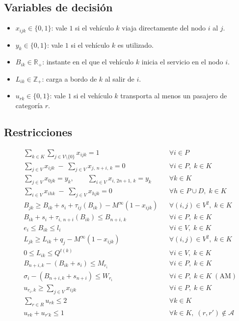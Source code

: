 \subsection{Variables de decisión}
\begin{itemize}
    \item $x_{ijk}\in\{0,1\}$: vale $1$ si el vehículo $k$ viaja directamente del nodo $i$ al $j$.
    \item $y_k\in\{0,1\}$: vale $1$ si el vehículo $k$ es utilizado.
    \item $B_{ik}\in\mathbb{R}_+$: instante en el que el vehículo $k$ inicia el servicio en el nodo $i$.
    \item $L_{ik}\in\mathbb{Z}_+$: carga a bordo de $k$ al salir de $i$.
    \item $u_{rk}\in\{0,1\}$: vale $1$ si el vehículo $k$ transporta al menos un pasajero de categoría $r$.
\end{itemize}

\subsection{Restricciones}
\vspace{-1cm}
\begin{align}
& \sum_{k\in K}\sum_{j\in V\setminus\{0\}} x_{ijk} = 1 && \forall i\in P \label{eq:r1}\\
& \sum_{j\in V} x_{ijk} \;-\; \sum_{j\in V} x_{j,\,n+i,\,k} = 0 && \forall i\in P,\; k\in K \label{eq:r2}\\
& \sum_{j\in V} x_{0jk} = y_k,\qquad \sum_{i\in V} x_{i,\,2n+1,\,k} = y_k && \forall k\in K \label{eq:r3}\\
& \sum_{i\in V} x_{ihk} \;-\; \sum_{j\in V} x_{hjk} = 0 && \forall h\in P\cup D,\; k\in K \label{eq:r4}\\
& B_{jk} \geq B_{ik} + s_i + \tau_{ij}(B_{ik}) - M^\infty(1-x_{ijk}) && \forall (i,j)\in V^2,\; k\in K \label{eq:r5}\\
& B_{ik} + s_i + \tau_{i,\,n+i}(B_{ik}) \leq B_{n+i,\,k} && \forall i\in P,\; k\in K \label{eq:r6}\\
& e_i \leq B_{ik} \leq l_i && \forall i\in V,\; k\in K \label{eq:r7}\\
& L_{jk} \geq L_{ik} + q_j - M^\infty(1-x_{ijk}) && \forall (i,j)\in V^2,\; k\in K \label{eq:r8}\\
& 0 \leq L_{ik} \leq Q^{t(k)} && \forall i\in V,\; k\in K \label{eq:r9}\\
& B_{n+i,k} - (B_{ik} + s_i) \leq M_{r_i} && \forall i\in P,\; k\in K \label{eq:r10}\\
& \sigma_i - (B_{n+i,k} + s_{n+i}) \leq W_{r_i} && \forall i\in P,\; k\in K \;(\mathrm{AM}) \label{eq:r11}\\
& u_{r_i,k} \geq \sum_{j\in V} x_{ijk} && \forall i\in P,\; k\in K \label{eq:r12}\\
& \sum_{r\in R} u_{rk} \leq 2 && \forall k\in K \label{eq:r13}\\
& u_{rk} + u_{r'k} \leq 1 && \forall k\in K,\; (r,r')\notin\mathcal{A} \label{eq:r14}
\end{align}



